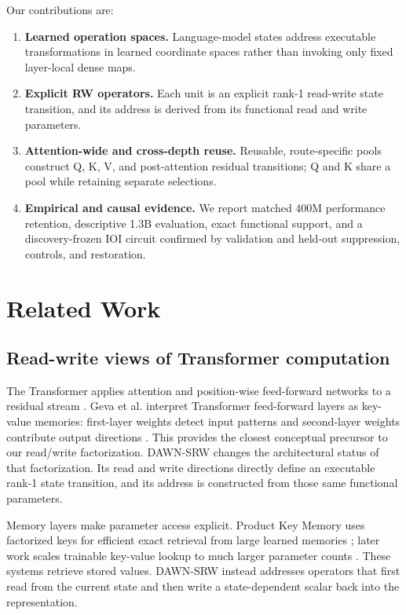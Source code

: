 \documentclass{article}
\newcommand{\DAWN}{DAWN-SRW}
\begin{document}
Our contributions are:
\begin{enumerate}
    \item \textbf{Learned operation spaces.} Language-model states address
    executable transformations in learned coordinate spaces rather than
    invoking only fixed layer-local dense maps.
    \item \textbf{Explicit RW operators.} Each unit is an explicit rank-1
    read-write state transition, and its address is derived from its functional
    read and write parameters.
    \item \textbf{Attention-wide and cross-depth reuse.} Reusable,
    route-specific pools construct Q, K, V, and post-attention residual
    transitions; Q and K share a pool while retaining separate selections.
    \item \textbf{Empirical and causal evidence.} We report matched 400M
    performance retention, descriptive 1.3B evaluation, exact functional
    support, and a discovery-frozen IOI circuit confirmed by validation and
    held-out suppression, controls, and restoration.
\end{enumerate}

\section{Related Work}
\label{sec:related}

\subsection{Read-write views of Transformer computation}

The Transformer applies attention and position-wise feed-forward networks to a
residual stream \cite{vaswani2017attention}. Geva et al. interpret Transformer
feed-forward layers as key-value memories: first-layer weights detect input
patterns and second-layer weights contribute output directions
\cite{geva2021transformer}. This provides the closest conceptual precursor to
our read/write factorization. \DAWN{} changes the architectural status of that
factorization. Its read and write directions directly define an executable
rank-1 state transition, and its address is constructed from those same
functional parameters.

Memory layers make parameter access explicit. Product Key Memory uses
factorized keys for efficient exact retrieval from large learned memories
\cite{lample2019large}; later work scales trainable key-value lookup to much
larger parameter counts \cite{berges2024memory}. These systems retrieve stored
values. \DAWN{} instead addresses operators that first read from the current
state and then write a state-dependent scalar back into the representation.
\end{document}
